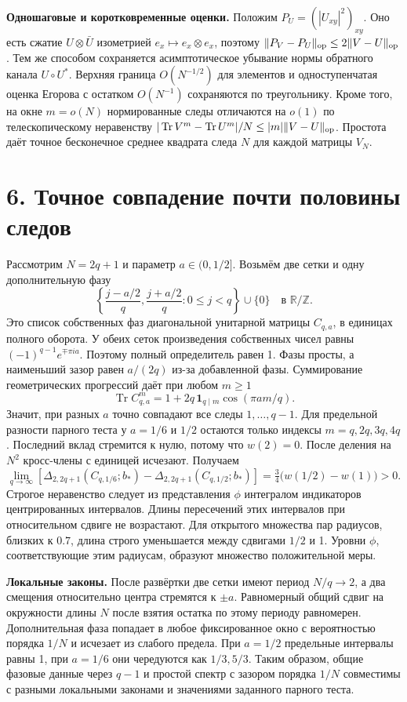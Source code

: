 \documentclass[11pt,a4paper]{article}
\newcommand{\Tr}{\operatorname{Tr}}
\newcommand{\R}{\mathbb R}
\newcommand{\Z}{\mathbb Z}
\newcommand{\sect}[1]{\section*{\sffamily\color{ink}#1}}
\newcommand{\subt}[1]{\par\medskip\noindent\textbf{#1.}\quad}
\begin{document}
\subt{Одношаговые и коротковременные оценки}
Положим \(P_U=(|U_{xy}|^2)_{xy}\). Оно есть сжатие \(U\otimes\bar U\) изометрией \(e_x\mapsto e_x\otimes e_x\), поэтому \(\|P_V-P_U\|_{\rm op}\le2\|V-U\|_{\rm op}\). Тем же способом сохраняется асимптотическое убывание нормы обратного канала \(U\circ U^*\). Верхняя граница \(O(N^{-1/2})\) для элементов и одноступенчатая оценка Егорова с остатком \(O(N^{-1})\) сохраняются по треугольнику. Кроме того, на окне \(m=o(N)\) нормированные следы отличаются на \(o(1)\) по телескопическому неравенству \(|\Tr V^m-\Tr U^m|/N\le |m|\|V-U\|_{\rm op}\). Простота даёт точное бесконечное среднее квадрата следа \(N\) для каждой матрицы \(V_N\).

\newpage
\sect{6. Точное совпадение почти половины следов}
Рассмотрим \(N=2q+1\) и параметр \(a\in(0,1/2]\). Возьмём две сетки и одну дополнительную фазу
\[
 \left\{\frac{j-a/2}{q},\frac{j+a/2}{q}\colon0\le j<q\right\}\cup\{0\}
                  \quad\text{в }\R/\Z .
\]
Это список собственных фаз диагональной унитарной матрицы \(C_{q,a}\), в единицах полного оборота. У обеих сеток произведения собственных чисел равны \((-1)^{q-1}e^{\mp\pi i a}\). Поэтому полный определитель равен 1. Фазы просты, а наименьший зазор равен \(a/(2q)\) из-за добавленной фазы. Суммирование геометрических прогрессий даёт при любом \(m\ge1\)
\[
      \Tr C_{q,a}^m=1+2q\,\mathbf1_{q\mid m}\cos(\pi a m/q).
\]
Значит, при разных \(a\) точно совпадают все следы \(1,\ldots,q-1\). Для предельной разности парного теста у \(a=1/6\) и \(1/2\) остаются только индексы \(m=q,2q,3q,4q\). Последний вклад стремится к нулю, потому что \(w(2)=0\). После деления на \(N^2\) кросс-члены с единицей исчезают. Получаем
\[
  \lim_{q\to\infty}\!
  \left[\Delta_{2,2q+1}(C_{q,1/6};b_*)
              -\Delta_{2,2q+1}(C_{q,1/2};b_*)\right]
       =\tfrac34\bigl(w(1/2)-w(1)\bigr)>0.
\]
Строгое неравенство следует из представления \(\phi\) интегралом индикаторов центрированных интервалов. Длины пересечений этих интервалов при относительном сдвиге не возрастают. Для открытого множества пар радиусов, близких к \(0.7\), длина строго уменьшается между сдвигами \(1/2\) и 1. Уровни \(\phi\), соответствующие этим радиусам, образуют множество положительной меры.

\subt{Локальные законы}
После развёртки две сетки имеют период \(N/q\to2\), а два смещения относительно центра стремятся к \(\pm a\). Равномерный общий сдвиг на окружности длины \(N\) после взятия остатка по этому периоду равномерен. Дополнительная фаза попадает в любое фиксированное окно с вероятностью порядка \(1/N\) и исчезает из слабого предела. При \(a=1/2\) предельные интервалы равны 1, при \(a=1/6\) они чередуются как \(1/3,5/3\). Таким образом, общие фазовые данные через \(q-1\) и простой спектр с зазором порядка \(1/N\) совместимы с разными локальными законами и значениями заданного парного теста.
\end{document}
